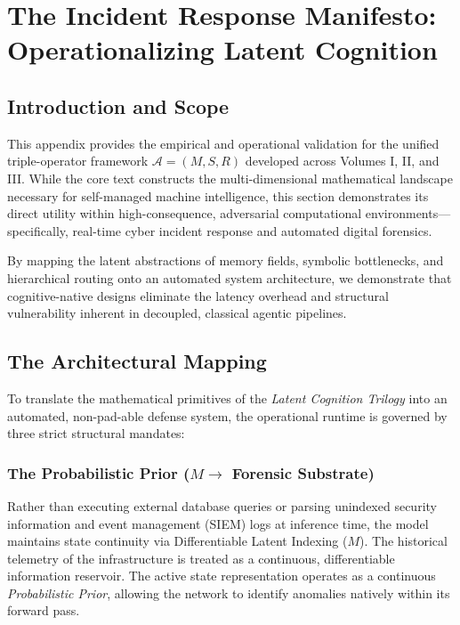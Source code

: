 \chapter{The Incident Response Manifesto: Operationalizing Latent Cognition}
\label{app:manifesto}

\section{Introduction and Scope}
This appendix provides the empirical and operational validation for the unified triple-operator framework $\mathcal{A} = (M, S, R)$ developed across Volumes I, II, and III. While the core text constructs the multi-dimensional mathematical landscape necessary for self-managed machine intelligence, this section demonstrates its direct utility within high-consequence, adversarial computational environments---specifically, real-time cyber incident response and automated digital forensics.

By mapping the latent abstractions of memory fields, symbolic bottlenecks, and hierarchical routing onto an automated system architecture, we demonstrate that cognitive-native designs eliminate the latency overhead and structural vulnerability inherent in decoupled, classical agentic pipelines.

\section{The Architectural Mapping}
To translate the mathematical primitives of the \textit{Latent Cognition Trilogy} into an automated, non-pad-able defense system, the operational runtime is governed by three strict structural mandates:

\subsection{The Probabilistic Prior ($M \to$ Forensic Substrate)}
Rather than executing external database queries or parsing unindexed security information and event management (SIEM) logs at inference time, the model maintains state continuity via Differentiable Latent Indexing ($M$). The historical telemetry of the infrastructure is treated as a continuous, differentiable information reservoir. The active state representation operates as a continuous \textit{Probabilistic Prior}, allowing the network to identify anomalies natively within its forward pass.

